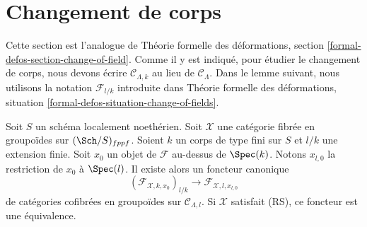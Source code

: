 \section{Changement de corps}
\label{section-change-of-field}

\noindent
Cette section est l'analogue de Théorie formelle des déformations, section
\ref{formal-defos-section-change-of-field}. Comme il y est indiqué, pour
étudier le changement de corps, nous devons écrire
$\mathcal{C}_{\Lambda,k}$ au lieu de $\mathcal{C}_\Lambda$. Dans le lemme
suivant, nous utilisons la notation $\mathcal{F}_{l/k}$ introduite dans Théorie
formelle des déformations, situation
\ref{formal-defos-situation-change-of-fields}.

\begin{lemma}
\label{lemma-change-of-field}
Soit $S$ un schéma localement noethérien. Soit $\mathcal{X}$ une catégorie
fibrée en groupoïdes sur $(\Sch/S)_{fppf}$. Soient $k$ un corps de type fini
sur $S$ et $l/k$ une extension finie. Soit $x_0$ un objet de $\mathcal{F}$
au-dessus de $\Spec(k)$. Notons $x_{l,0}$ la restriction de $x_0$ à
$\Spec(l)$. Il existe alors un foncteur canonique
$$
(\mathcal{F}_{\mathcal{X}, k , x_0})_{l/k}
\longrightarrow
\mathcal{F}_{\mathcal{X}, l, x_{l, 0}}
$$
de catégories cofibrées en groupoïdes sur $\mathcal{C}_{\Lambda,l}$. Si
$\mathcal{X}$ satisfait (RS), ce foncteur est une équivalence.
\end{lemma}

